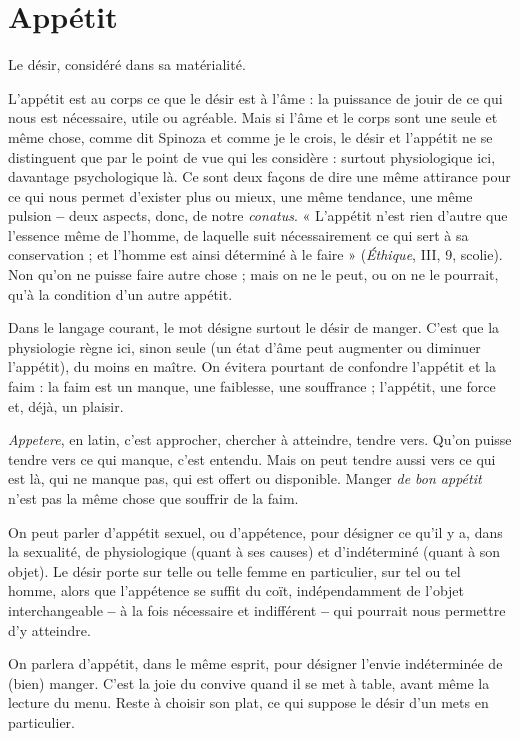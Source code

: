 \section{Appétit}
Le désir, considéré dans sa matérialité.

L’appétit est au corps ce que le désir est à l’âme : la puissance de
jouir de ce qui nous est nécessaire, utile ou agréable. Mais si l'âme et le corps
sont une seule et même chose, comme dit Spinoza et comme je le crois, le désir
et l'appétit ne se distinguent que par le point de vue qui les considère : surtout
physiologique ici, davantage psychologique là. Ce sont deux façons de dire une
même attirance pour ce qui nous permet d’exister plus ou mieux, une même
tendance, une même pulsion {\bf --} deux aspects, donc, de notre {\it conatus}. « L’appétit
n’est rien d’autre que l’essence même de l’homme, de laquelle suit nécessairement
ce qui sert à sa conservation ; et l’homme est ainsi déterminé à le faire »
({\it Éthique}, III, 9, scolie). Non qu’on ne puisse faire autre chose ; mais on ne le
peut, ou on ne le pourrait, qu’à la condition d’un autre appétit.

Dans le langage courant, le mot désigne surtout le désir de manger. C’est
que la physiologie règne ici, sinon seule (un état d’âme peut augmenter ou
diminuer l’appétit), du moins en maître. On évitera pourtant de confondre
l'appétit et la faim : la faim est un manque, une faiblesse, une souffrance ;
l'appétit, une force et, déjà, un plaisir.

{\it Appetere}, en latin, c’est approcher, chercher à atteindre, tendre vers. Qu’on
puisse tendre vers ce qui manque, c’est entendu. Mais on peut tendre aussi vers
ce qui est là, qui ne manque pas, qui est offert ou disponible. Manger {\it de bon
appétit} n’est pas la même chose que souffrir de la faim.

On peut parler d’appétit sexuel, ou d’appétence, pour désigner ce qu’il y a,
dans la sexualité, de physiologique (quant à ses causes) et d’indéterminé (quant
à son objet). Le désir porte sur telle ou telle femme en particulier, sur tel ou tel
homme, alors que l’appétence se suffit du coït, indépendamment de l’objet
interchangeable {\bf --} à la fois nécessaire et indifférent {\bf --} qui pourrait nous permettre
d’y atteindre.

On parlera d’appétit, dans le même esprit, pour désigner l’envie indéterminée
de (bien) manger. C’est la joie du convive quand il se met à table, avant
même la lecture du menu. Reste à choisir son plat, ce qui suppose le désir d’un
mets en particulier.

